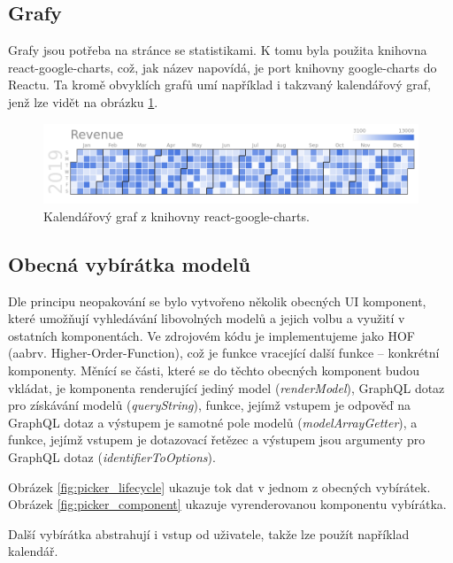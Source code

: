 \subsection{Grafy} \label{graphs}

\noindent
Grafy jsou potřeba na stránce se statistikami. K tomu byla použita knihovna react-google-charts,
což, jak název napovídá, je port knihovny google-charts do Reactu. Ta kromě obvyklích grafů umí
například i takzvaný kalendářový graf, jenž lze vidět na obrázku \ref{fig:google_charts}.

\begin{figure}[!htb] \centering
  \includegraphics[width=145mm]{../img/google_charts.png}
  \caption{Kalendářový graf z knihovny react-google-charts.}
  \label{fig:google_charts}
\end{figure}

\subsection{Obecná vybírátka modelů}

\noindent
Dle principu neopakování se bylo vytvořeno několik obecných UI komponent, které umožňují vyhledávání libovolných
modelů a jejich volbu a využití v ostatních komponentách. Ve zdrojovém kódu je implementujeme jako
HOF (aabrv. Higher-Order-Function), což je funkce vracející další funkce -- konkrétní komponenty.
Měnící se části, které se do těchto obecných komponent budou vkládat, je komponenta renderující jediný model
(\textit{renderModel}),
GraphQL dotaz pro získávání modelů (\textit{queryString}), funkce, jejímž vstupem je odpověď na GraphQL dotaz a výstupem je
samotné pole modelů (\textit{modelArrayGetter}), a funkce, jejímž vstupem je dotazovací řetězec a výstupem jsou
argumenty pro GraphQL dotaz (\textit{identifierToOptions}).

Obrázek \ref{fig:picker_lifecycle} ukazuje tok dat v jednom z obecných vybírátek.
Obrázek \ref{fig:picker_component} ukazuje vyrenderovanou komponentu vybírátka.

Další vybírátka abstrahují i vstup od uživatele, takže lze použít například kalendář.

